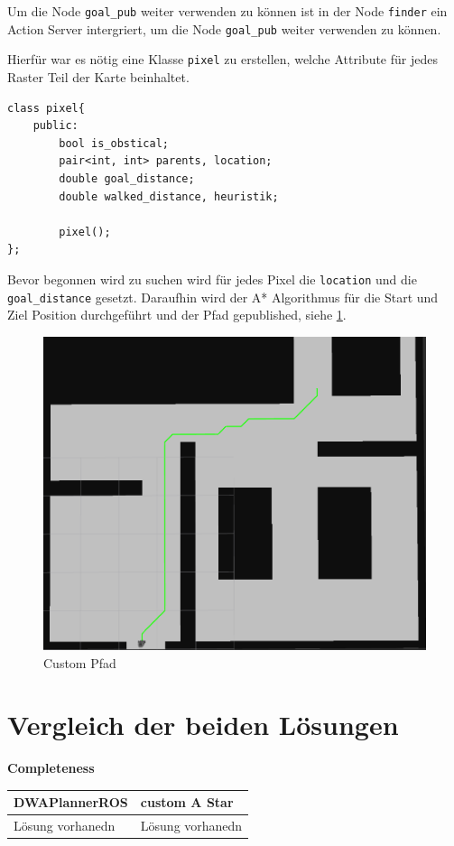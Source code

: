\documentclass{article}
\begin{document}
Um die Node \verb|goal_pub| weiter verwenden zu können ist in der Node \verb|finder| ein Action Server intergriert, um die Node \verb|goal_pub| weiter verwenden zu können.

Hierfür war es nötig eine Klasse \texttt{pixel} zu erstellen, welche Attribute für jedes Raster Teil der Karte beinhaltet.

\begin{lstlisting}
class pixel{
    public:
        bool is_obstical;
        pair<int, int> parents, location;
        double goal_distance;
        double walked_distance, heuristik;

        pixel();
};
\end{lstlisting}

Bevor begonnen wird zu suchen wird für jedes Pixel die \verb|location| und die \verb|goal_distance| gesetzt. 
Daraufhin wird der A* Algorithmus für die Start und Ziel Position durchgeführt und der Pfad gepublished, siehe \ref{path_custom}.

\begin{figure}[!htbp]
    \centering
    \includegraphics[width=0.5\linewidth]{PICs/custom_rviz_plan.png}
    \caption{Custom Pfad}\label{path_custom}
\end{figure}

\section{Vergleich der beiden Lösungen}

\textbf{Completeness}\newline

\begin{table}[!htbp]
    \begin{tabular}{p{7cm}|p{7cm}}
        DWAPlannerROS & custom A Star \\ \bottomrule
        Lösung vorhanedn & Lösung vorhanedn
    \end{tabular}
\end{table}
\end{document}
